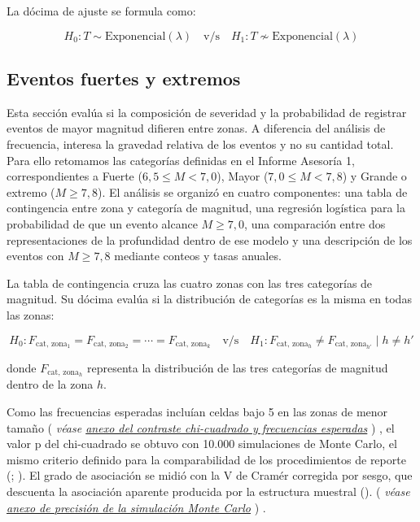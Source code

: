 \documentclass[
  spanish,
  letterpaper,
  DIV=11,
  numbers=noendperiod]{scrartcl}
\newcommand{\asesoriaParenRef}[1]{%
  \textnormal{\textcolor{asesoriaTextColor}{(}}%
  {\hypersetup{linkcolor=asesoriaLinkColor,urlcolor=asesoriaLinkColor,citecolor=asesoriaLinkColor}\textcolor{asesoriaTextColor}{\emph{#1}}}%
  \textnormal{\textcolor{asesoriaTextColor}{)}}%
}
\begin{document}
La dócima de ajuste se formula como:

\begingroup
\setlength{\abovedisplayskip}{0pt}
\setlength{\belowdisplayskip}{0pt}
\setlength{\abovedisplayshortskip}{0pt}
\setlength{\belowdisplayshortskip}{0pt}
\vspace{-1.10em}
\[
H_0: T \sim \text{Exponencial}(\lambda)
\quad \text{v/s} \quad
H_1: T \not\sim \text{Exponencial}(\lambda)
\]
\vspace{-1.15em}
\endgroup

\subsection{Eventos fuertes y extremos}\label{sec-met-extremos}

Esta sección evalúa si la composición de severidad y la probabilidad de
registrar eventos de mayor magnitud difieren entre zonas. A diferencia
del análisis de frecuencia, interesa la gravedad relativa de los eventos
y no su cantidad total. Para ello retomamos las categorías definidas en
el Informe Asesoría 1, correspondientes a Fuerte
(\(6{,}5 \leq M < 7{,}0\)), Mayor (\(7{,}0 \leq M < 7{,}8\)) y Grande o
extremo (\(M \geq 7{,}8\)). El análisis se organizó en cuatro
componentes: una tabla de contingencia entre zona y categoría de
magnitud, una regresión logística para la probabilidad de que un evento
alcance \(M \geq 7{,}0\), una comparación entre dos representaciones de
la profundidad dentro de ese modelo y una descripción de los eventos con
\(M \geq 7{,}8\) mediante conteos y tasas anuales.

La tabla de contingencia cruza las cuatro zonas con las tres categorías
de magnitud. Su dócima evalúa si la distribución de categorías es la
misma en todas las zonas:

\begingroup
\setlength{\abovedisplayskip}{0pt}
\setlength{\belowdisplayskip}{0pt}
\setlength{\abovedisplayshortskip}{0pt}
\setlength{\belowdisplayshortskip}{0pt}
\vspace{-1.10em}
\[
H_0: F_{\text{cat},\,\text{zona}_1}=F_{\text{cat},\,\text{zona}_2}=\cdots=F_{\text{cat},\,\text{zona}_k}
\quad \text{v/s} \quad
H_1: F_{\text{cat},\,\text{zona}_h}\neq F_{\text{cat},\,\text{zona}_{h'}} \mid h \neq h'
\]
\vspace{-1.15em}
\endgroup

donde \(F_{\text{cat},\,\text{zona}_h}\) representa la distribución de
las tres categorías de magnitud dentro de la zona \(h\).

Como las frecuencias esperadas incluían celdas bajo 5 en las zonas de
menor tamaño
\asesoriaParenRef{véase \hyperref[sec-anexo-chi-esperadas]{anexo del contraste chi-cuadrado y frecuencias esperadas}},
el valor p del chi-cuadrado se obtuvo con 10.000 simulaciones de Monte
Carlo, el mismo criterio definido para la comparabilidad de los
procedimientos de reporte (;
). El grado de asociación
se midió con la V de Cramér corregida por sesgo, que descuenta la
asociación aparente producida por la estructura muestral
().
\asesoriaParenRef{véase \hyperref[sec-anexo-montecarlo]{anexo de precisión de la simulación Monte Carlo}}.
\end{document}
